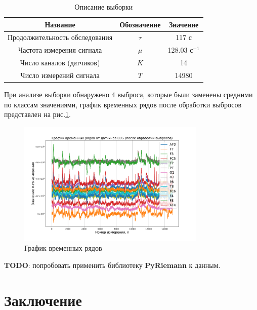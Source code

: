 \documentclass[a4paper, 12pt]{extarticle}
\begin{document}
\begin{table}
	\centering
	\caption{Описание выборки}
	\begin{tabular}{|c|c|c|}
		\hline
		Название                       & Обозначение & Значение             \\
		\hline \hline
		Продолжительность обследования & $\tau$         & 117 с                \\ \hline
		Частота измерения сигнала      & $\mu$       & 128.03 $\text{с}^{-1}$   \\ \hline
	    Число каналов (датчиков)    & $K$   & 14          \\ \hline
		Число измерений сигнала             & $T$  & 14980           \\ \hline
	\end{tabular}
	\label{table:sample}
\end{table}
При анализе выборки обнаружено 4 выброса, которые были заменены средними по классам 
значениями, график временных рядов после обработки выбросов представлен на рис.\ref{fig:2}.

\begin{figure}[h]
	\centering
	\includegraphics[width=0.8\textwidth]{Dataset.pdf}
	\caption{График временных рядов}
	\label{fig:2}
\end{figure}


\textbf{TODO}: попробовать применить библиотеку \textbf{PyRiemann} к данным.

\section{Заключение}


\newpage



\end{document}
